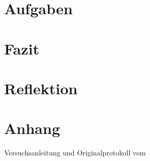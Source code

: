 \documentclass[12pt, a4paper, twoside]{article}
\begin{document}
\section{Aufgaben}
\section{Fazit}
\section{Reflektion}
\section{Anhang}
Versuchsanleitung und Originalprotokoll vom \labdate
\end{document}
